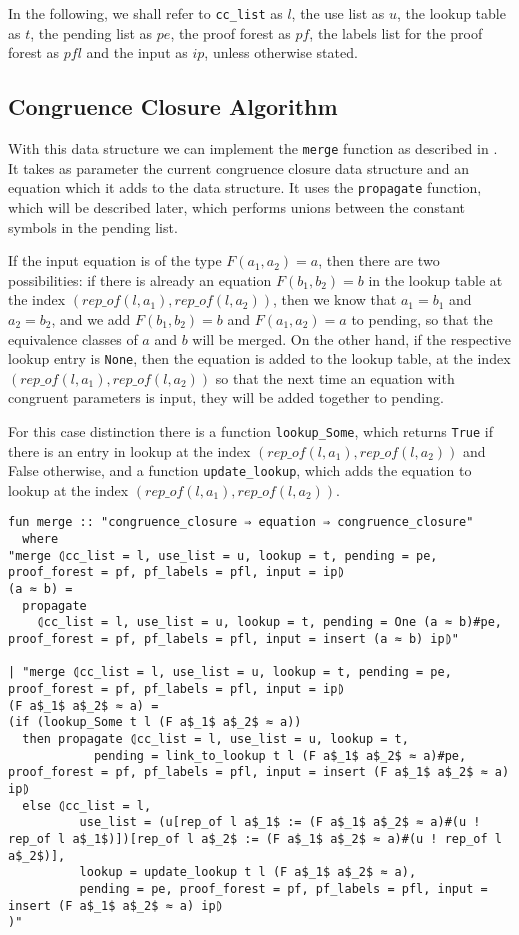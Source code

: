 In the following, we shall refer to \lstinline{cc_list} as $l$, the use list as $u$, the lookup table as $t$, the pending list as $pe$, the proof forest as $pf$, the labels list for the proof forest as $pfl$ and the input as $ip$, unless otherwise stated.

\subsection{Congruence Closure Algorithm}

With this data structure we can implement the \lstinline{merge} function as described in \cite{Nieuwenhuis}.
It takes as parameter the current congruence closure data structure and an equation which it adds to the data structure. It uses the \lstinline{propagate} function, which will be described later, which performs unions between the constant symbols in the pending list.

If the input equation is of the type $F(a_1, a_2) = a$, then there are two possibilities: if there is already an equation $F(b_1, b_2) = b$ in the lookup table at the index $(rep\_of(l,a_1), rep\_of(l,a_2))$, then we know that $a_1 = b_1$ and $a_2 = b_2$, and we add $F(b_1, b_2) = b$ and $F(a_1, a_2) = a$ to pending, so that the equivalence classes of $a$ and $b$ will be merged.
On the other hand, if the respective lookup entry is \lstinline{None}, then the equation is added to the lookup table, at the index $(rep\_of(l,a_1), rep\_of(l,a_2))$ so that the next time an equation with congruent parameters is input, they will be added together to pending.

For this case distinction there is a function \lstinline{lookup_Some}, which returns \lstinline{True} if there is an entry in lookup at the index $(rep\_of(l,a_1), rep\_of(l,a_2))$ and False otherwise, and a function \lstinline{update_lookup}, which adds the equation to lookup at the index $(rep\_of(l,a_1), rep\_of(l,a_2))$.

\begin{lstlisting}
fun merge :: "congruence_closure ⇒ equation ⇒ congruence_closure"
  where
"merge ⦇cc_list = l, use_list = u, lookup = t, pending = pe, proof_forest = pf, pf_labels = pfl, input = ip⦈
(a ≈ b) =
  propagate
    ⦇cc_list = l, use_list = u, lookup = t, pending = One (a ≈ b)#pe, proof_forest = pf, pf_labels = pfl, input = insert (a ≈ b) ip⦈"

| "merge ⦇cc_list = l, use_list = u, lookup = t, pending = pe, proof_forest = pf, pf_labels = pfl, input = ip⦈
(F a$_1$ a$_2$ ≈ a) =
(if (lookup_Some t l (F a$_1$ a$_2$ ≈ a))
  then propagate ⦇cc_list = l, use_list = u, lookup = t,
            pending = link_to_lookup t l (F a$_1$ a$_2$ ≈ a)#pe, proof_forest = pf, pf_labels = pfl, input = insert (F a$_1$ a$_2$ ≈ a) ip⦈
  else ⦇cc_list = l,
          use_list = (u[rep_of l a$_1$ := (F a$_1$ a$_2$ ≈ a)#(u ! rep_of l a$_1$)])[rep_of l a$_2$ := (F a$_1$ a$_2$ ≈ a)#(u ! rep_of l a$_2$)],
          lookup = update_lookup t l (F a$_1$ a$_2$ ≈ a),
          pending = pe, proof_forest = pf, pf_labels = pfl, input = insert (F a$_1$ a$_2$ ≈ a) ip⦈
)"
\end{lstlisting}

